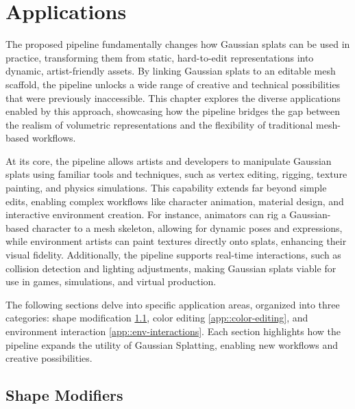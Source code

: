 \chapter{Applications}

\label{applications}

The proposed pipeline fundamentally changes how Gaussian splats can be used in practice, transforming them from static, hard-to-edit representations into dynamic, artist-friendly assets. By linking Gaussian splats to an editable mesh scaffold, the pipeline unlocks a wide range of creative and technical possibilities that were previously inaccessible. This chapter explores the diverse applications enabled by this approach, showcasing how the pipeline bridges the gap between the realism of volumetric representations and the flexibility of traditional mesh-based workflows.

At its core, the pipeline allows artists and developers to manipulate Gaussian splats using familiar tools and techniques, such as vertex editing, rigging, texture painting, and physics simulations. This capability extends far beyond simple edits, enabling complex workflows like character animation, material design, and interactive environment creation. For instance, animators can rig a Gaussian-based character to a mesh skeleton, allowing for dynamic poses and expressions, while environment artists can paint textures directly onto splats, enhancing their visual fidelity. Additionally, the pipeline supports real-time interactions, such as collision detection and lighting adjustments, making Gaussian splats viable for use in games, simulations, and virtual production.

The following sections delve into specific application areas, organized into three categories: shape modification \ref{app::shape-modiers}, color editing \ref{app::color-editing}, and environment interaction \ref{app::env-interactions}. Each section highlights how the pipeline expands the utility of Gaussian Splatting, enabling new workflows and creative possibilities.

\section{Shape Modifiers}

\label{app::shape-modiers}





